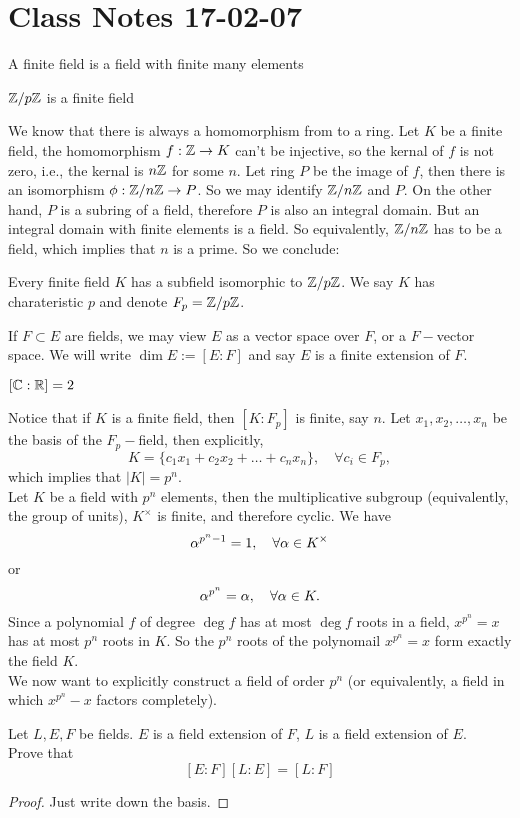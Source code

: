 \section{Class Notes 17-02-07}
\begin{definition}
	A finite field is a field with finite many elements
\end{definition}
\begin{example}
	$\mathbb{Z}/p\mathbb{Z}$ is a finite field
\end{example}
We know that there is always a homomorphism from \Z to a ring. Let $K$ be a finite field, the homomorphism $f: \mathbb{Z}\rightarrow K$ can't be injective, so the kernal of $f$ is not zero, i.e., the kernal is $n\mathbb{Z}$ for some $n$. Let ring $P$ be the image of $f$, then there is an isomorphism $\phi: \mathbb{Z}/n\mathbb{Z}\rightarrow P$. So we may identify $\mathbb{Z}/n\mathbb{Z}$ and $P$. On the other hand, $P$ is a subring of a field, therefore $P$ is also an integral domain. But an integral domain with finite elements is a field. So equivalently, $\mathbb{Z}/n\mathbb{Z}$ has to be a field, which implies that $n$ is a prime. So we conclude: 
\begin{theorem}
Every finite field $K$ has a subfield isomorphic to $\mathbb{Z}/p\mathbb{Z}$. We say $K$ has charateristic $p$ and denote $F_p=\mathbb{Z}/p\mathbb{Z}$.
\end{theorem}
If $F\subset E$ are fields, we may view $E$ as a vector space over $F$, or a $F-$vector space. We will write $\dim{E}:=[E:F]$ and say $E$ is a finite extension of $F$.
\begin{example}
	$[\mathbb{C}:\mathbb{R}]=2$
\end{example}
Notice that if $K$ is a finite field, then $[K:F_p]$ is finite, say $n$. Let $x_1,x_2,\ldots, x_n$ be the basis of the $F_p-$field, then explicitly, $$K=\{c_1x_1+c_2x_2+\ldots + c_nx_n\},\quad\forall c_i\in F_p,$$which implies that $|K| = p^n$.\\
Let $K$ be a field with $p^n$ elements, then the multiplicative subgroup (equivalently, the group of units), $K^{\times}$ is finite, and therefore cyclic. We have $$\alpha^{p^n-1}=1,\quad\forall \alpha\in K^{\times}$$or $$\alpha^{p^n}=\alpha,\quad\forall \alpha\in K.$$Since a polynomial $f$ of degree $\deg f$ has at most $\deg f$ roots in a field, $x^{p^n}=x$ has at most $p^n$ roots in $K$. So the $p^n$ roots of the polynomail $x^{p^n}=x$ form exactly the field $K$.\\
We now want to explicitly construct a field of order $p^n$ (or equivalently, a field in which $x^{p^n}-x$ factors completely). 
\begin{exercise}
	Let $L,E,F$ be fields. $E$ is a field extension of $F$, $L$ is a field extension of $E$.\\ Prove that 
	$$[E:F][L:E]=[L:F]
	$$ 
\end{exercise}
\begin{proof}
Just write down the basis.
\end{proof}

